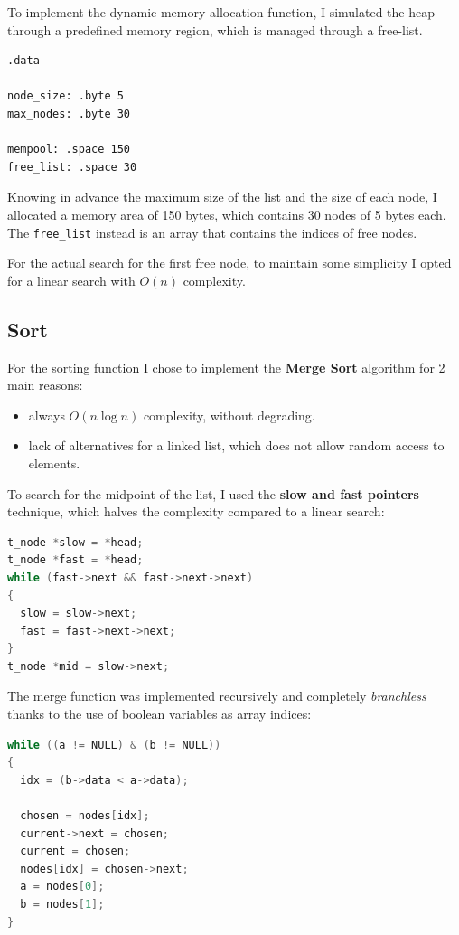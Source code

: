 \documentclass[a4paper,12pt]{article}
\begin{document}
To implement the dynamic memory allocation function, I simulated the heap through a predefined memory region, which is managed through a free-list.

\begin{lstlisting}[language=riscv]
.data

node_size: .byte 5
max_nodes: .byte 30

mempool: .space 150
free_list: .space 30
\end{lstlisting}

Knowing in advance the maximum size of the list and the size of each node, I allocated a memory area of 150 bytes, which contains 30 nodes of 5 bytes each.
The \texttt{free\_list} instead is an array that contains the indices of free nodes.

For the actual search for the first free node, to maintain some simplicity I opted for a linear search with $O(n)$ complexity.

\subsection{Sort}

For the sorting function I chose to implement the \textbf{Merge Sort} algorithm for 2 main reasons:
\begin{itemize}
    \item always $O(n \log n)$ complexity, without degrading.
    \item lack of alternatives for a linked list, which does not allow random access to elements.
\end{itemize}

To search for the midpoint of the list, I used the \textbf{slow and fast pointers} technique, which halves the complexity compared to a linear search:

\begin{lstlisting}[language=C]
t_node *slow = *head;
t_node *fast = *head;
while (fast->next && fast->next->next)
{
  slow = slow->next;
  fast = fast->next->next;
}
t_node *mid = slow->next;
\end{lstlisting}

The merge function was implemented recursively and completely \emph{branchless} thanks to the use of boolean variables as array indices:

\begin{lstlisting}[language=C]
while ((a != NULL) & (b != NULL))
{
  idx = (b->data < a->data);

  chosen = nodes[idx];
  current->next = chosen;
  current = chosen;
  nodes[idx] = chosen->next;
  a = nodes[0];
  b = nodes[1];
}
\end{lstlisting}
\end{document}
